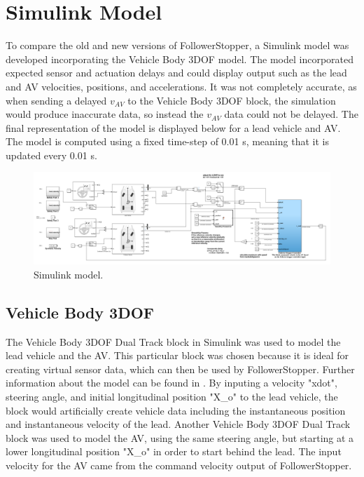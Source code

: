 \documentclass[conference]{IEEEtran}
\begin{document}
\section{Simulink Model}
To compare the old and new versions of FollowerStopper, a Simulink model was developed incorporating the Vehicle Body 3DOF model. The model incorporated expected sensor and actuation delays and could display output such as the lead and AV velocities, positions, and accelerations. It was not completely accurate, as when sending a delayed $v_{AV}$ to the Vehicle Body 3DOF block, the simulation would produce inaccurate data, so instead the $v_{AV}$ data could not be delayed. The final representation of the model is displayed below for a lead vehicle and AV. The model is computed using a fixed time-step of 0.01 s, meaning that it is updated every 0.01 s.

\begin{figure}[htbp]
\centerline{\includegraphics[width=3.5 in]{simulink_model.png}}
\caption{Simulink model.}
\label{fig2}
\end{figure}

\subsection{Vehicle Body 3DOF}
The Vehicle Body 3DOF Dual Track block in Simulink was used to model the lead vehicle and the AV. This particular block was chosen because it is ideal for creating virtual sensor data, which can then be used by FollowerStopper. Further information about the model can be found in \cite{vehicledynamicsblockset}. By inputing a velocity "xdot", steering angle, and initial longitudinal position "X\_o" to the lead vehicle, the block would artificially create vehicle data including the instantaneous position and instantaneous velocity of the lead. Another Vehicle Body 3DOF Dual Track block was used to model the AV, using the same steering angle, but starting at a lower longitudinal position "X\_o" in order to start behind the lead. The input velocity for the AV came from the command velocity output of FollowerStopper.
\end{document}
